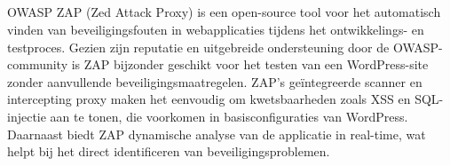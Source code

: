 \subsection{}
OWASP ZAP (Zed Attack Proxy) is een open-source tool voor het automatisch vinden van beveiligingsfouten 
in webapplicaties tijdens het ontwikkelings- en testproces. Gezien zijn reputatie en uitgebreide 
ondersteuning door de OWASP-community is ZAP bijzonder geschikt voor het testen van een 
WordPress-site zonder aanvullende beveiligingsmaatregelen. ZAP's geïntegreerde scanner en 
intercepting proxy maken het eenvoudig om kwetsbaarheden zoals XSS en SQL-injectie aan te 
tonen, die voorkomen in basisconfiguraties van WordPress. Daarnaast biedt ZAP dynamische 
analyse van de applicatie in real-time, wat helpt bij het direct identificeren van beveiligingsproblemen.


\section{}

